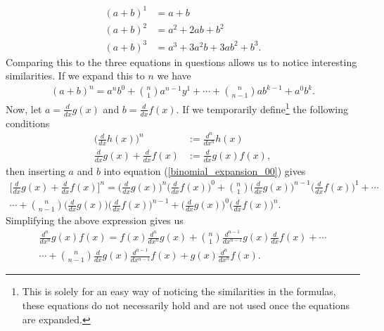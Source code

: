 \begin{align}
	(a+b)^1&=a+b\\
	(a+b)^2&= a^2+2ab+b^2 \\
	(a+b)^3 &= a^3+3a^2b+3ab^2+b^3.
\end{align}
Comparing this to the three equations in questions allows us to notice interesting similarities. If we expand this to $n$ we have
\begin{align}
	(a+b)^n=a^nb^0+{{n}\choose{1}}a^{n-1}y^1+\cdots+{{n}\choose{n-1}}ab^{k-1}+a^0b^k. \label{binomial_expansion_00}
\end{align}
Now, let $a=\frac{d}{dx}g(x)$ and $b=\frac{d}{dx}f(x)$. If we temporarily define\footnote{This is solely for an easy way of noticing the similarities in the formulas, these equations do not necessarily hold and are not used once the equations are expanded.} the following conditions
\begin{align}
	\bigg(\frac{d}{dx}h(x)\bigg)^n&:=\frac{d^n}{dx^n}h(x) \label{redefinition_derivative_00}\\
	\frac{d}{dx}g(x)+\frac{d}{dx}f(x) &:= \frac{d}{dx}g(x)f(x) \label{redefinition_derivative_01},
\end{align}
then inserting $a$ and $b$ into equation (\ref{binomial_expansion_00}) gives
\begin{align}
	\bigg[\frac{d}{dx}g(x)+\frac{d}{dx}f(x) \bigg]^n=\bigg(\frac{d}{dx}g(x)\bigg)^n\bigg(\frac{d}{dx}f(x)\bigg)^0+{{n}\choose{1}}\bigg(\frac{d}{dx}g(x)\bigg)^{n-1}\bigg(\frac{d}{dx}f(x)\bigg)^1+\cdots \\ \cdots+{{n}\choose{n-1}}\bigg(\frac{d}{dx}g(x)\bigg)\bigg(\frac{d}{dx}f(x)\bigg)^{n-1}+\bigg(\frac{d}{dx}g(x)\bigg)^0\bigg(\frac{d}{dx}f(x)\bigg)^n.
\end{align}
Simplifying the above expression gives us
\begin{align}
	\frac{d^n}{dx^n}g(x)f(x)=f(x)\frac{d^n}{dx^n}g(x)+{{n}\choose{1}}\frac{d^{n-1}}{dx^{n-1}}g(x)\frac{d}{dx}f(x)+\cdots \\
	\cdots+{{n}\choose{n-1}}\frac{d}{dx}g(x)\frac{d^{n-1}}{dx^{n-1}}f(x)+g(x)\frac{d^n}{dx^n}f(x).
\end{align}
